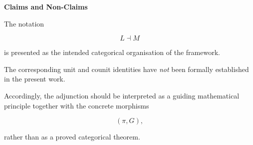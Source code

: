 
\begin{remarkbox}

\BodyFont

\textbf{Claims and Non-Claims}

The notation

\[
L\dashv M
\]

is presented as the intended categorical organisation of the framework.

The corresponding unit and counit identities have \emph{not} been
formally established in the present work.

Accordingly, the adjunction should be interpreted as a guiding
mathematical principle together with the concrete morphisms

\[
(\pi,G),
\]

rather than as a proved categorical theorem.

\end{remarkbox}